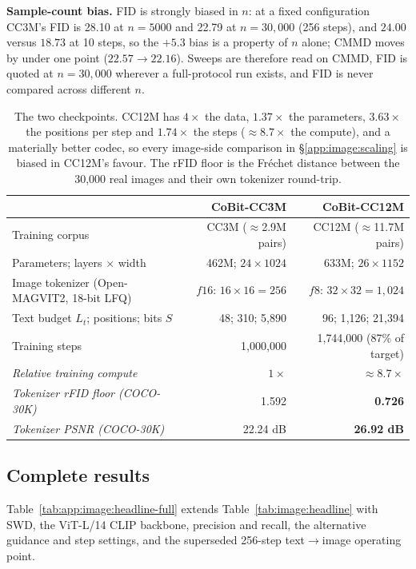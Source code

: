 \textbf{Sample-count bias.} FID is strongly biased in $n$: at a fixed configuration CC3M's FID is
28.10 at $n{=}5000$ and 22.79 at $n{=}30{,}000$ (256 steps), and $24.00$ versus $18.73$ at 10
steps, so the $+5.3$ bias is a property of $n$ alone; CMMD moves by under one point
($22.57\rightarrow22.16$). Sweeps are therefore read on CMMD, FID is quoted at $n{=}30{,}000$
wherever a full-protocol run exists, and FID is never compared across different $n$.

\begin{table}[tb]
\centering
\footnotesize
\begin{tabular}{lrr}
\toprule
& \textbf{CoBit-CC3M} & \textbf{CoBit-CC12M} \\
\midrule
Training corpus & CC3M ($\approx$2.9M pairs) & CC12M ($\approx$11.7M pairs) \\
Parameters; layers $\times$ width & 462M; $24\times1024$ & 633M; $26\times1152$ \\
Image tokenizer (Open-MAGVIT2, 18-bit LFQ) & $f16$: $16{\times}16=256$ & $f8$: $32{\times}32=1{,}024$ \\
Text budget $L_t$; positions; bits $S$ & 48; 310; 5{,}890 & 96; 1{,}126; 21{,}394 \\
Training steps & 1{,}000{,}000 & 1{,}744{,}000 (87\% of target) \\
\midrule
\emph{Relative training compute} & $1\times$ & $\approx8.7\times$ \\
\emph{Tokenizer rFID floor (COCO-30K)} & 1.592 & \textbf{0.726} \\
\emph{Tokenizer PSNR (COCO-30K)} & 22.24 dB & \textbf{26.92 dB} \\
\bottomrule
\end{tabular}
\caption{The two checkpoints. CC12M has $4\times$ the data, $1.37\times$ the parameters,
$3.63\times$ the positions per step and $1.74\times$ the steps ($\approx8.7\times$ the compute),
and a materially better codec, so every image-side comparison in \S\ref{app:image:scaling} is
biased in CC12M's favour. The rFID floor is the Fr\'echet distance between the 30{,}000 real
images and their own tokenizer round-trip.}
\label{tab:app:image:modeldiff}
\end{table}

\subsection{Complete results}
\label{app:image:headline-full}

Table~\ref{tab:app:image:headline-full} extends Table~\ref{tab:image:headline} with SWD, the
ViT-L/14 CLIP backbone, precision and recall, the alternative guidance and step settings, and the
superseded 256-step text$\rightarrow$image operating point.

